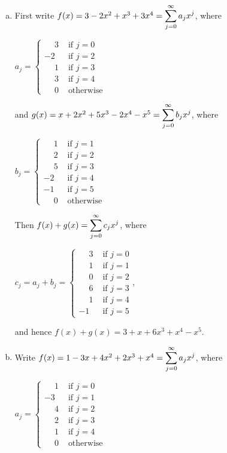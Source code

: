 \documentclass[11pt,fleqn,dvipsnames,usenames]{article}
\begin{document}
\begin{enumerate}[1.]
\solution
\begin{enumerate}[(a)]
\item First write $f(x) = 3 - 2x^2 + x^3 + 3x^4 = \displaystyle\sum\limits_{j=0}^{\infty}a_{j}x^{j}$, where
\begin{center}
$a_{j} = \begin{cases}\phantom{-}3 & \text{ if }j=0\\-2 &\text{ if }j=2\\\phantom{-}1 & \text{ if }j=3\\\phantom{-}3&\text{ if }j=4\\\phantom{-}0&\text{ otherwise}\end{cases}$
\end{center}
and $g(x) = x + 2x^2 + 5x^3 - 2x^4 - x^5 = \displaystyle\sum\limits_{j=0}^{\infty}b_{j}x^{j}$, where
\begin{center}
$b_{j} = \begin{cases}\phantom{-}1 & \text{ if }j=1\\\phantom{-}2 &\text{ if }j=2\\\phantom{-}5 & \text{ if }j=3\\-2&\text{ if }j=4\\
-1&\text{ if } j=5\\\phantom{-}0&\text{ otherwise}\end{cases}$
\end{center}
Then $f(x) + g(x) = \displaystyle\sum\limits_{j=0}^{\infty}c_{j}x^{j}$, where
\begin{center}
$c_{j} = a_{j} + b_{j} = \begin{cases}\phantom{-}3&\text{ if }j=0\\\phantom{-}1&\text{ if }j=1\\\phantom{-}0&\text{ if }j=2\\\phantom{-}6&\text{ if }j=3\\\phantom{-}1&\text{ if }j=4\\-1&\text{ if }j=5\end{cases}$,
\end{center}
and hence $f(x) + g(x) = 3 + x + 6x^3 + x^4 - x^5$.
\item Write $f(x) = 1 - 3x + 4x^2 + 2x^3 + x^4 = \displaystyle\sum\limits_{j=0}^{\infty}a_{j}x^{j}$, where
\begin{center}
$a_{j} = \begin{cases}\phantom{-}1 & \text{ if }j=0\\-3 &\text{ if }j=1\\\phantom{-}4 & \text{ if }j=2\\\phantom{-}2&\text{ if }j=3\\\phantom{-}1&\text{ if }j=4\\\phantom{-}0&\text{ otherwise}\end{cases}$

\end{center}
\end{enumerate}
\end{enumerate}
\end{document}
